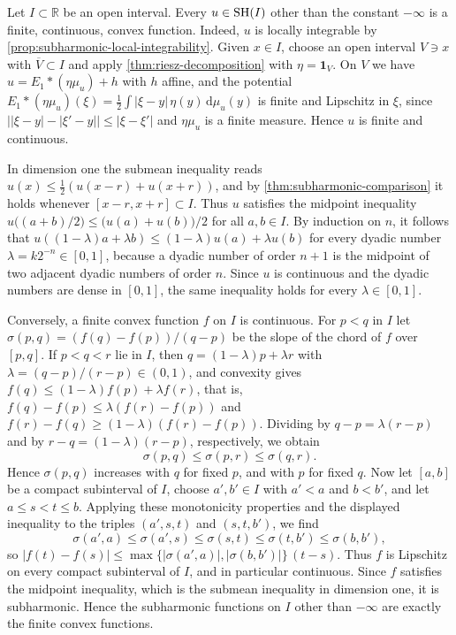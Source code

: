 \begin{example}\label{ex:subharmonic-convex-log}
Let $I\subset\mathbb R$ be an open interval. Every $u\in\mathrm{SH}(I)$ other than the constant $-\infty$ is a finite, continuous, convex function. Indeed, $u$ is locally integrable by \cref{prop:subharmonic-local-integrability}. Given $x\in I$, choose an open interval $V\ni x$ with $\overline V\subset I$ and apply \cref{thm:riesz-decomposition} with $\eta=\mathbf 1_V$. On $V$ we have $u=E_1*(\eta\mu_u)+h$ with $h$ affine, and the potential $E_1*(\eta\mu_u)(\xi)=\frac12\int|\xi-y|\,\eta(y)\,\mathrm d\mu_u(y)$ is finite and Lipschitz in $\xi$, since $\bigl||\xi-y|-|\xi'-y|\bigr|\leq|\xi-\xi'|$ and $\eta\mu_u$ is a finite measure. Hence $u$ is finite and continuous.

In dimension one the submean inequality reads $u(x)\leq\frac12(u(x-r)+u(x+r))$, and by \cref{thm:subharmonic-comparison} it holds whenever $[x-r,x+r]\subset I$. Thus $u$ satisfies the midpoint inequality $u\bigl((a+b)/2\bigr)\leq\bigl(u(a)+u(b)\bigr)/2$ for all $a,b\in I$. By induction on $n$, it follows that $u((1-\lambda)a+\lambda b)\leq(1-\lambda)u(a)+\lambda u(b)$ for every dyadic number $\lambda=k2^{-n}\in[0,1]$, because a dyadic number of order $n+1$ is the midpoint of two adjacent dyadic numbers of order $n$. Since $u$ is continuous and the dyadic numbers are dense in $[0,1]$, the same inequality holds for every $\lambda\in[0,1]$.

Conversely, a finite convex function $f$ on $I$ is continuous. For $p<q$ in $I$ let $\sigma(p,q)=(f(q)-f(p))/(q-p)$ be the slope of the chord of $f$ over $[p,q]$. If $p<q<r$ lie in $I$, then $q=(1-\lambda)p+\lambda r$ with $\lambda=(q-p)/(r-p)\in(0,1)$, and convexity gives $f(q)\leq(1-\lambda)f(p)+\lambda f(r)$, that is, $f(q)-f(p)\leq\lambda(f(r)-f(p))$ and $f(r)-f(q)\geq(1-\lambda)(f(r)-f(p))$. Dividing by $q-p=\lambda(r-p)$ and by $r-q=(1-\lambda)(r-p)$, respectively, we obtain
\[
 \sigma(p,q)\leq\sigma(p,r)\leq\sigma(q,r).
\]
Hence $\sigma(p,q)$ increases with $q$ for fixed $p$, and with $p$ for fixed $q$. Now let $[a,b]$ be a compact subinterval of $I$, choose $a',b'\in I$ with $a'<a$ and $b<b'$, and let $a\leq s<t\leq b$. Applying these monotonicity properties and the displayed inequality to the triples $(a',s,t)$ and $(s,t,b')$, we find
\[
 \sigma(a',a)\leq\sigma(a',s)\leq\sigma(s,t)\leq\sigma(t,b')\leq\sigma(b,b'),
\]
so $|f(t)-f(s)|\leq\max\{|\sigma(a',a)|,|\sigma(b,b')|\}\,(t-s)$. Thus $f$ is Lipschitz on every compact subinterval of $I$, and in particular continuous. Since $f$ satisfies the midpoint inequality, which is the submean inequality in dimension one, it is subharmonic. Hence the subharmonic functions on $I$ other than $-\infty$ are exactly the finite convex functions.


\end{example}
